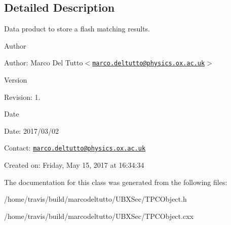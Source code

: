 \subsection{\-Detailed \-Description}
\-Data product to store a flash matching results. 

\begin{DoxyAuthor}{\-Author}

\end{DoxyAuthor}
\begin{DoxyParagraph}{\-Author\-:}
\-Marco \-Del \-Tutto$<$\href{mailto:marco.deltutto@physics.ox.ac.uk}{\tt marco.\-deltutto@physics.\-ox.\-ac.\-uk}$>$ 
\end{DoxyParagraph}


\begin{DoxyVersion}{\-Version}

\end{DoxyVersion}
\begin{DoxyParagraph}{\-Revision\-:}
1. 
\end{DoxyParagraph}


\begin{DoxyDate}{\-Date}

\end{DoxyDate}
\begin{DoxyParagraph}{\-Date\-:}
2017/03/02 
\end{DoxyParagraph}


\-Contact\-: \href{mailto:marco.deltutto@physics.ox.ac.uk}{\tt marco.\-deltutto@physics.\-ox.\-ac.\-uk}

\-Created on\-: \-Friday, \-May 15, 2017 at 16\-:34\-:34 

\-The documentation for this class was generated from the following files\-:\begin{DoxyCompactItemize}
\item 
/home/travis/build/marcodeltutto/\-U\-B\-X\-Sec/\-T\-P\-C\-Object.\-h\item 
/home/travis/build/marcodeltutto/\-U\-B\-X\-Sec/\-T\-P\-C\-Object.\-cxx\end{DoxyCompactItemize}
